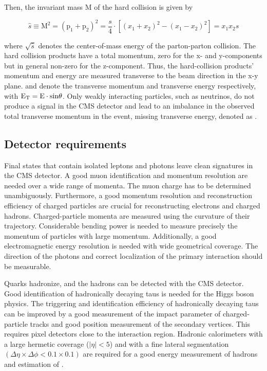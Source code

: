 Then, the invariant mass M of the hard collision is given by

\begin{equation}
  \hat{s} \equiv \mathrm{M}^{2}=\left(\mathrm{p}_{1}+\mathrm{p}_{2}\right)^{2}=\frac{s}{4} \cdot\left[\left(x_{1}+x_{2}\right)^{2}-\left(x_{1}-x_{2}\right)^{2}\right]=x_{1} x_{2} s
\end{equation}

where $\sqrt{\hat{s}}$ denotes the center-of-mass energy of the parton-parton collision. The hard collision products have a total momentum, zero for the x- and y-components but in general non-zero for the z-component. Thus, the hard-collision products' momentum and energy are measured transverse to the beam direction in the x-y plane. \pt and \ET denote the transverse momentum and transverse energy respectively, with $\text{E}_\text{T} = \text{E} \cdot \text{sin} \theta$. Only weakly interacting particles, such as neutrinos, do not produce a signal in the CMS detector and lead to an imbalance in the observed total transverse momentum in the event, missing transverse energy, denoted as \met.

\subsection{Detector requirements}
Final states that contain isolated leptons and photons leave clean signatures in the CMS detector. A good muon identification and momentum resolution are needed over a wide range of momenta. The muon charge has to be determined unambiguously. Furthermore, a good momentum resolution and reconstruction efficiency of charged particles are crucial for reconstructing electrons and charged hadrons. Charged-particle momenta are measured using the curvature of their trajectory. Considerable bending power is needed to measure precisely the momentum of particles with large momentum. Additionally, a good electromagnetic energy resolution is needed with wide geometrical coverage. The direction of the photons and correct localization of the primary interaction should be measurable.

Quarks hadronize, and the hadrons can be detected with the CMS detector. Good identification of hadronically decaying taus is needed for the Higgs boson physics. The triggering and identification efficiency of hadronically decaying taus can be improved by a good measurement of the impact parameter of charged-particle tracks and good position measurement of the secondary vertices. This requires pixel detectors close to the interaction region. Hadronic calorimeters with a large hermetic coverage ($|\eta| < 5$) and with a fine lateral segmentation $(\Delta \eta \times \Delta \phi<0.1 \times 0.1)$ are required for a good energy measurement of hadrons and estimation of \met.

